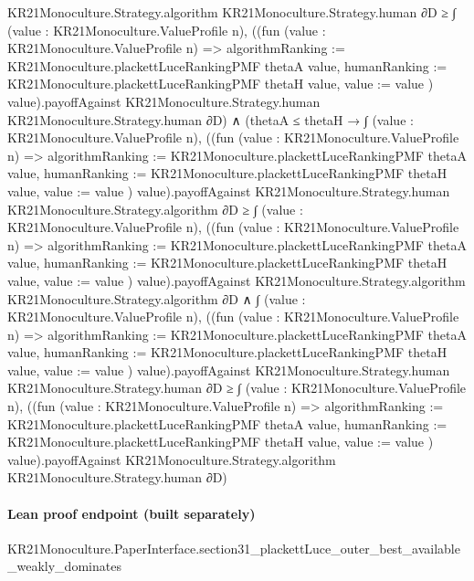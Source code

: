 \documentclass[10pt]{article}
\begin{document}
\begin{ReviewVerbatim}
              KR21Monoculture.Strategy.algorithm KR21Monoculture.Strategy.human ∂D ≥
          ∫ (value : KR21Monoculture.ValueProfile n),
            ((fun (value : KR21Monoculture.ValueProfile n) =>
                    { algorithmRanking := KR21Monoculture.plackettLuceRankingPMF thetaA value,
                      humanRanking := KR21Monoculture.plackettLuceRankingPMF thetaH value, value := value })
                  value).payoffAgainst
              KR21Monoculture.Strategy.human KR21Monoculture.Strategy.human ∂D) ∧
    (thetaA ≤ thetaH →
      ∫ (value : KR21Monoculture.ValueProfile n),
            ((fun (value : KR21Monoculture.ValueProfile n) =>
                    { algorithmRanking := KR21Monoculture.plackettLuceRankingPMF thetaA value,
                      humanRanking := KR21Monoculture.plackettLuceRankingPMF thetaH value, value := value })
                  value).payoffAgainst
              KR21Monoculture.Strategy.human KR21Monoculture.Strategy.algorithm ∂D ≥
          ∫ (value : KR21Monoculture.ValueProfile n),
            ((fun (value : KR21Monoculture.ValueProfile n) =>
                    { algorithmRanking := KR21Monoculture.plackettLuceRankingPMF thetaA value,
                      humanRanking := KR21Monoculture.plackettLuceRankingPMF thetaH value, value := value })
                  value).payoffAgainst
              KR21Monoculture.Strategy.algorithm KR21Monoculture.Strategy.algorithm ∂D ∧
        ∫ (value : KR21Monoculture.ValueProfile n),
            ((fun (value : KR21Monoculture.ValueProfile n) =>
                    { algorithmRanking := KR21Monoculture.plackettLuceRankingPMF thetaA value,
                      humanRanking := KR21Monoculture.plackettLuceRankingPMF thetaH value, value := value })
                  value).payoffAgainst
              KR21Monoculture.Strategy.human KR21Monoculture.Strategy.human ∂D ≥
          ∫ (value : KR21Monoculture.ValueProfile n),
            ((fun (value : KR21Monoculture.ValueProfile n) =>
                    { algorithmRanking := KR21Monoculture.plackettLuceRankingPMF thetaA value,
                      humanRanking := KR21Monoculture.plackettLuceRankingPMF thetaH value, value := value })
                  value).payoffAgainst
              KR21Monoculture.Strategy.algorithm KR21Monoculture.Strategy.human ∂D)
\end{ReviewVerbatim}

\paragraph{Lean proof endpoint (built separately)}\begin{ReviewVerbatim}
KR21Monoculture.PaperInterface.section31_plackettLuce_outer_best_available_weakly_dominates
\end{ReviewVerbatim}
\end{document}
